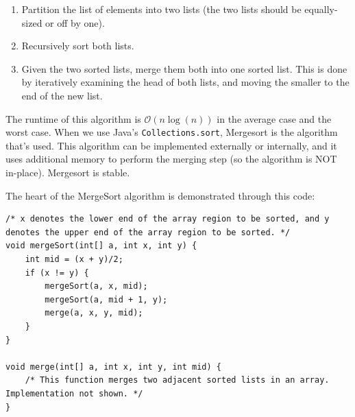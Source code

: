 \begin{enumerate}
    \item Partition the list of elements into two lists (the two lists should be equally-sized or off by one).
    \item Recursively sort both lists. 
    \item Given the two sorted lists, merge them both into one sorted list. This is done by iteratively examining the head of both lists, and moving the smaller to the end of the new list. 
\end{enumerate}

The runtime of this algorithm is $\mathcal{O}(n\log(n))$ in the average case and the worst case. When we use Java's \verb!Collections.sort!, Mergesort is the algorithm that's used. This algorithm can be implemented externally or internally, and it uses additional memory to perform the merging step (so the algorithm is NOT in-place). Mergesort is stable. 

The heart of the MergeSort algorithm is demonstrated through this code:

\begin{lstlisting}
/* x denotes the lower end of the array region to be sorted, and y denotes the upper end of the array region to be sorted. */
void mergeSort(int[] a, int x, int y) {
    int mid = (x + y)/2;
    if (x != y) {
        mergeSort(a, x, mid);
        mergeSort(a, mid + 1, y);
        merge(a, x, y, mid);
    }
}

void merge(int[] a, int x, int y, int mid) {
    /* This function merges two adjacent sorted lists in an array. Implementation not shown. */
}
\end{lstlisting}